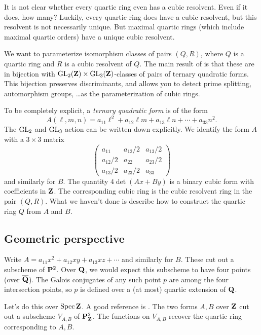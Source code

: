 It is not clear whether every quartic ring even has a cubic resolvent. Even if 
it does, how many? Luckily, every quartic ring does have a cubic resolvent, but 
this resolvent is not necessarily unique. But maximal quartic rings (which 
include maximal quartic orders) have a unique cubic resolvent. 

We want to parameterize isomorphism classes of pairs $(Q,R)$, where $Q$ is a 
quartic ring and $R$ is a cubic resolvent of $Q$. The main result of 
\cite{b04} is that these are in bijection with 
$\operatorname{GL}_2(\mathbf{Z})\times \operatorname{GL}_3(\mathbf{Z})$-classes of pairs of ternary 
quadratic forms. This bijection preserves discriminants, and allows you to 
detect prime splitting, automorphism groups, \ldots as the parameterization of 
cubic rings. 

To be completely explicit, a \emph{ternary quadratic form} is of the form 
\[
  A(\ell,m,n) = a_{1 1} \ell^2 + a_{1 2} \ell m + a_{1 3} \ell n + \cdots + a_{3 3} n^2 .
\]
The $\operatorname{GL}_2$ and $\operatorname{GL}_3$ action can be written down 
explicitly. We identify the form $A$ with a $3\times 3$ matrix 
\[
  \begin{pmatrix} a_{11} & a_{12}/2 & a_{13}/2 \\ a_{12}/2 & a_{22} & a_{23}/2 \\ a_{13}/2 & a_{23}/2 & a_{33} \end{pmatrix} 
\]
and similarly for $B$. The quantity $4\det(A x+B y)$ is a binary cubic 
form with coefficients in $\mathbf{Z}$. The corresponding cubic ring is the cubic 
resolvent ring in the pair $(Q,R)$. What we haven't done is describe how to 
construct the quartic ring $Q$ from $A$ and $B$. 





\subsection{Geometric perspective}

Write $A=a_{11} x^2+a_{1 2} x y + a_{1 3} x z + \cdots$ and similarly for $B$. 
These cut out a subscheme of $\mathbf{P}^2$. Over $\mathbf{Q}$, we would expect this subscheme 
to have four points (over $\overline{\mathbf{Q}}$). The Galois conjugates of any such 
point $p$ are among the four intersection points, so $p$ is defined over a 
(at most) quartic extension of $\mathbf{Q}$. 

Let's do this over $\operatorname{Spec} \mathbf{Z}$. A good reference is \cite{w11}. The two 
forms $A,B$ over $\mathbf{Z}$ cut out a subscheme $V_{A,B}$ of $\mathbf{P}_{\mathbf{Z}}^2$. The 
functions on $V_{A,B}$ recover the quartic ring corresponding to $A,B$. 

